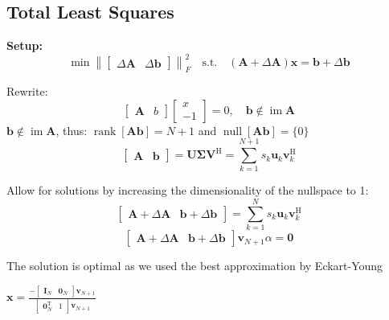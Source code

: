 \documentclass[english]{latex4ei/latex4ei_sheet}
\begin{document}
\begin{sectionbox}
  \subsection{Total Least Squares}
  \textbf{Setup:}
  $$\min \left\|\left[\begin{array}{ll}
    \Delta \boldsymbol{A} & \Delta \boldsymbol{b}
  \end{array}\right]\right\|_{F}^{2} \quad\text{s.t.} \quad (\boldsymbol{A}+\Delta \boldsymbol{A}) \boldsymbol{x}=\boldsymbol{b}+\Delta \boldsymbol{b}$$

  Rewrite:
  $$\left[\begin{array}{ll}
    \boldsymbol{A} & b
    \end{array}\right]\left[\begin{array}{c}
    x \\
    -1
    \end{array}\right]=0, \quad \boldsymbol{b} \notin \operatorname{im} \boldsymbol{A}$$
  $\boldsymbol{b} \notin \operatorname{im} \boldsymbol{A}$, thus: $\operatorname{rank} [\boldsymbol{Ab}] = N + 1$ and $\operatorname{null} [\boldsymbol{Ab}] = \{0\}$\\
  $$\left[\begin{array}{ll}
    \boldsymbol{A} & \boldsymbol{b}
    \end{array}\right]=\boldsymbol{U} \boldsymbol{\Sigma} \boldsymbol{V}^{\mathrm{H}}=\sum_{k=1}^{N+1} s_{k} \boldsymbol{u}_{k} \boldsymbol{v}_{k}^{\mathrm{H}}$$

  Allow for solutions by increasing the dimensionality of the nullspace to 1:
    $$\left[\begin{array}{cc}
    \boldsymbol{A}+\Delta \boldsymbol{A} & \boldsymbol{b}+\Delta \boldsymbol{b}
    \end{array}\right]=\sum_{k=1}^{N} s_{k} \boldsymbol{u}_{k} \boldsymbol{v}_{k}^{\mathrm{H}}$$
  $$\left[\begin{array}{ll}
    \boldsymbol{A}+\Delta \boldsymbol{A} & \boldsymbol{b}+\Delta \boldsymbol{b}
    \end{array}\right] \boldsymbol{v}_{N+1} \alpha=\mathbf{0}$$
  
  The solution is optimal as we used the best approximation by Eckart-Young

  \begin{emphbox}
    $\boldsymbol{x}=\frac{-\left[\begin{array}{ll}
      \mathbf{I}_{N} & \mathbf{0}_{N}
      \end{array}\right] \boldsymbol{v}_{N+1}}{\left[\begin{array}{ll}
      \mathbf{0}_{N}^{\mathrm{T}} & 1
      \end{array}\right] \boldsymbol{v}_{N+1}}$
  \end{emphbox}
\end{sectionbox}
\end{document}
